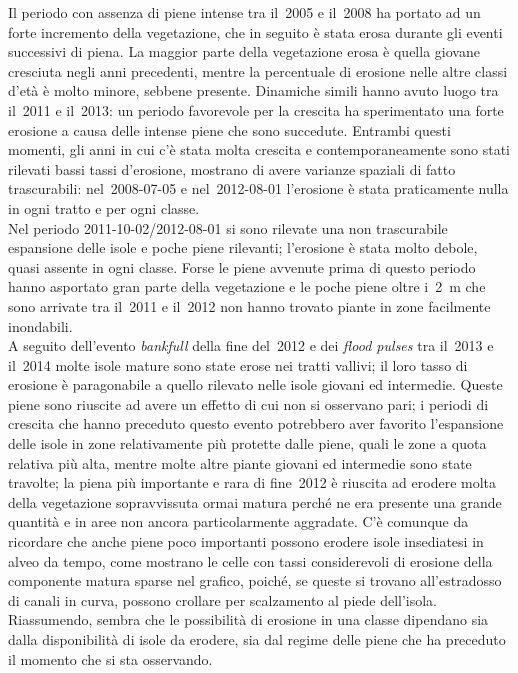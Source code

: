Il periodo con assenza di piene intense tra il~2005 e il~2008 ha portato ad un forte incremento della vegetazione, che in seguito è stata erosa durante gli eventi successivi di piena.
La maggior parte della vegetazione erosa è quella giovane cresciuta negli anni precedenti, mentre la percentuale di erosione nelle altre classi d'età è molto minore, sebbene presente.
Dinamiche simili hanno avuto luogo tra il~2011 e il~2013: un periodo favorevole per la crescita ha sperimentato una forte erosione a causa delle intense piene che sono succedute.
Entrambi questi momenti, gli anni in cui c'è stata molta crescita e contemporaneamente sono stati rilevati bassi tassi d'erosione, mostrano di avere varianze spaziali di fatto trascurabili: nel~2008-07-05 e nel~2012-08-01 l'erosione è stata praticamente nulla in ogni tratto e per ogni classe.
\\
Nel periodo 2011-10-02/2012-08-01 si sono rilevate una non trascurabile espansione delle isole e poche piene rilevanti; l'erosione è stata molto debole, quasi assente in ogni classe. Forse le piene avvenute prima di questo periodo hanno asportato gran parte della vegetazione e le poche piene oltre i~\SI{2}{\m} che sono arrivate tra il~2011 e il~2012 non hanno trovato piante in zone facilmente inondabili.
\\
A seguito dell'evento \emph{bankfull} della fine del~2012 e dei \emph{flood pulses} tra il~2013 e il~2014 molte isole mature sono state erose nei tratti vallivi; il loro tasso di erosione è paragonabile a quello rilevato nelle isole giovani ed intermedie. Queste piene sono riuscite ad avere un effetto di cui non si osservano pari; i periodi di crescita che hanno preceduto questo evento potrebbero aver favorito l'espansione delle isole in zone relativamente più protette dalle piene, quali le zone a quota relativa più alta, mentre molte altre piante giovani ed intermedie sono state travolte; la piena più importante e rara di fine~2012 è riuscita ad erodere molta della vegetazione sopravvissuta ormai matura perché ne era presente una grande quantità e in aree non ancora particolarmente aggradate.
C'è comunque da ricordare che anche piene poco importanti possono erodere isole insediatesi in alveo da tempo, come mostrano le celle con tassi considerevoli di erosione della componente matura sparse nel grafico, poiché, se queste si trovano all'estradosso di canali in curva, possono crollare per scalzamento al piede dell'isola.
\\
Riassumendo, sembra che le possibilità di erosione in una classe dipendano sia dalla disponibilità di isole da erodere, sia dal regime delle piene che ha preceduto il momento che si sta osservando.

